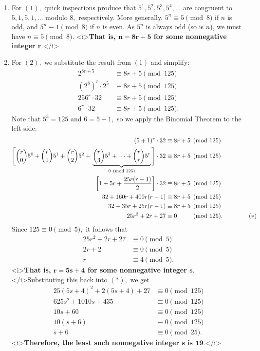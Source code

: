 \begin{enumerate}
 
            \begin{enumerate} 
        \item For $(1),$ quick inspections produce that $5^1,5^2,5^3,5^4,\ldots$ are congruent to $5,1,5,1,\ldots$ modulo $8,$ respectively. More generally, $5^n \equiv 5 \pmod{8}$ if $n$ is odd, and $5^n \equiv 1 \pmod{8}$ if $n$ is even. As $5^n$ is always odd (so is $n$), we must have $n\equiv5\pmod{8}.$ <i>\textbf{That is, $\boldsymbol{n=8r+5}$ for some nonnegative integer $\boldsymbol{r.}$}</i>


        \item For $(2),$ we substitute the result from $(1)$ and simplify:
 \begin{align*} 2^{8r+5}&\equiv8r+5\pmod{125} \\ \left(2^8\right)^r\cdot2^5&\equiv8r+5\pmod{125} \\ 256^r\cdot32&\equiv8r+5\pmod{125} \\ 6^r\cdot32&\equiv8r+5\pmod{125}. \end{align*}
Note that $5^3=125$ and $6=5+1,$ so we apply the Binomial Theorem to the left side:
 \begin{align*} (5+1)^r\cdot32&\equiv8r+5\pmod{125} \\ \Biggl[\binom{r}{0}5^0+\binom{r}{1}5^1+\binom{r}{2}5^2+\phantom{ }\underbrace{\binom{r}{3}5^3+\cdots+\binom{r}{r}5^r}_{0\pmod{125}}\phantom{ }\Biggr]\cdot32&\equiv8r+5\pmod{125} \\ \left[1+5r+\frac{25r(r-1)}{2}\right]\cdot32&\equiv8r+5\pmod{125} \\ 32+160r+400r(r-1)&\equiv8r+5\pmod{125} \\ 32+35r+25r(r-1)&\equiv8r+5\pmod{125} \\ 25r^2+2r+27&\equiv0\phantom{r+5}\pmod{125}. \hspace{15mm} (*) \end{align*}
Since $125\equiv0\pmod{5},$ it follows that
 \begin{align*} 25r^2+2r+27&\equiv0\pmod{5} \\ 2r+2&\equiv0\pmod{5} \\ r&\equiv4\pmod{5}. \end{align*}
<i>\textbf{That is, $\boldsymbol{r=5s+4}$ for some nonnegative integer $\boldsymbol{s.}$}</i>Substituting this back into $(*),$ we get
 \begin{align*} 25(5s+4)^2+2(5s+4)+27&\equiv0\pmod{125} \\ 625s^2+1010s+435&\equiv0\pmod{125} \\ 10s+60&\equiv0\pmod{125} \\ 10(s+6)&\equiv0\pmod{125} \\ s+6&\equiv0\pmod{25}. \end{align*}
<i>\textbf{Therefore, the least such nonnegative integer $\boldsymbol{s}$ is $\boldsymbol{19.}$}</i>


\end{enumerate}
\end{enumerate}
